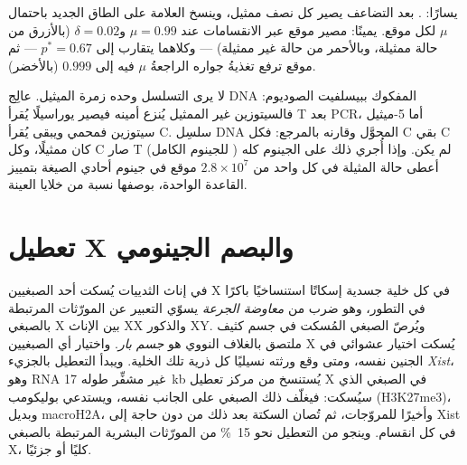 \begin{omfigure}
{\small يسارًا: . بعد التضاعف يصير كل  نصف ممثيل،
وينسخ  العلامة على الطاق الجديد باحتمال $\mu$ لكل موقع. يمينًا:
مصير موقع عبر الانقسامات عند $\mu = 0.99$ و$\delta = 0.02$ (بالأزرق
من حالة ممثيلة، وبالأحمر من حالة غير ممثيلة) --- وكلاهما يتقارب إلى
$p^{*} = 0.67$ --- ثم موقع ترفع تغذيةُ جواره الراجعةُ $\mu$ فيه إلى
$0.999$ (بالأخضر).}
\end{omfigure}

\begin{method}\label{met:b3:chromatin-epigenetics:bisulfite}
لا يرى التسلسل وحده زمرة الميثيل. عالِج DNA المفكوك ببيسلفيت
الصوديوم: فالسيتوزين غير الممثيل يُنزع أمينه فيصير يوراسيلًا يُقرأ
T بعد PCR، أما 5-ميثيل سيتوزين فمحمي ويبقى يُقرأ C. سلسِل DNA
المحوَّل وقارنه بالمرجع: فكل C بقي C كان ممثيلًا، وكل C صار T لم
يكن. وإذا أُجري ذلك على الجينوم كله ( للجينوم الكامل)
أعطى حالة المثيلة في كل واحد من $2.8\times 10^{7}$ موقع  في
جينوم أحادي الصيغة بتمييز القاعدة الواحدة، بوصفها نسبة من خلايا
العينة.
\end{method}

\section{تعطيل X والبصم الجينومي}

\begin{definition}\label{def:b3:chromatin-epigenetics:x-inactivation}
في إناث الثدييات يُسكت أحد الصبغيين X في كل خلية جسدية إسكاتًا
استنساخيًا باكرًا في التطور، وهو ضرب من \emph{معاوضة الجرعة} يسوّي
التعبير عن المورّثات المرتبطة بالصبغي X بين الإناث XX والذكور XY. ويُرصّ
الصبغي المُسكت في جسم كثيف ملتصق بالغلاف النووي هو \emph{جسم بار}.
واختيار أي الصبغيين X يُسكت اختيار عشوائي في الجنين نفسه، ومتى وقع
ورثته نسيليًا كل ذرية تلك الخلية. ويبدأ التعطيل بالجزيء \emph{Xist}، وهو
RNA غير مشفِّر طوله \qty{17}{kb} يُستنسخ من مركز تعطيل X في الصبغي
الذي سيُسكت: فيغلّف ذلك الصبغي على الجانب نفسه، ويستدعي بوليكومب
(H3K27me3)، وبديل  macroH2A، وأخيرًا  للمروّجات،
ثم تُصان السكتة بعد ذلك من دون حاجة إلى Xist في كل انقسام. وينجو من
التعطيل نحو \qty{15}{\%} من المورّثات البشرية المرتبطة بالصبغي X، كليًا أو
جزئيًا.
\end{definition}

